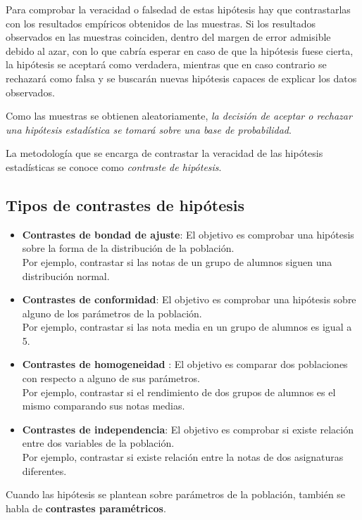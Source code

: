 \documentclass[
  spanish,
  a4paper,
]{scrreport}
\theoremstyle{plain}
\theoremstyle{definition}
\theoremstyle{definition}
\theoremstyle{remark}
\begin{document}
Para comprobar la veracidad o falsedad de estas hipótesis hay que
contrastarlas con los resultados empíricos obtenidos de las muestras. Si
los resultados observados en las muestras coinciden, dentro del margen
de error admisible debido al azar, con lo que cabría esperar en caso de
que la hipótesis fuese cierta, la hipótesis se aceptará como verdadera,
mientras que en caso contrario se rechazará como falsa y se buscarán
nuevas hipótesis capaces de explicar los datos observados.

Como las muestras se obtienen aleatoriamente, \emph{la decisión de
aceptar o rechazar una hipótesis estadística se tomará sobre una base de
probabilidad}.

La metodología que se encarga de contrastar la veracidad de las
hipótesis estadísticas se conoce como \emph{contraste de hipótesis}.

\subsection{Tipos de contrastes de
hipótesis}\label{tipos-de-contrastes-de-hipuxf3tesis}

\begin{itemize}
\item
  \textbf{Contrastes de bondad de ajuste}: El objetivo es comprobar una
  hipótesis sobre la forma de la distribución de la población.\\
  Por ejemplo, contrastar si las notas de un grupo de alumnos siguen una
  distribución normal.
\item
  \textbf{Contrastes de conformidad}: El objetivo es comprobar una
  hipótesis sobre alguno de los parámetros de la población.\\
  Por ejemplo, contrastar si las nota media en un grupo de alumnos es
  igual a 5.
\item
  \textbf{Contrastes de homogeneidad} : El objetivo es comparar dos
  poblaciones con respecto a alguno de sus parámetros.\\
  Por ejemplo, contrastar si el rendimiento de dos grupos de alumnos es
  el mismo comparando sus notas medias.
\item
  \textbf{Contrastes de independencia}: El objetivo es comprobar si
  existe relación entre dos variables de la población.\\
  Por ejemplo, contrastar si existe relación entre la notas de dos
  asignaturas diferentes.
\end{itemize}

Cuando las hipótesis se plantean sobre parámetros de la población,
también se habla de \textbf{contrastes paramétricos}.
\end{document}
